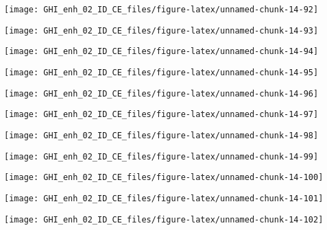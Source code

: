 \documentclass[
  10pt,
  a4paper,oneside]{article}
\begin{document}
\begin{center}\texttt{[image: GHI\_enh\_02\_ID\_CE\_files/figure-latex/unnamed-chunk-14-92]} \end{center}

\begin{center}\texttt{[image: GHI\_enh\_02\_ID\_CE\_files/figure-latex/unnamed-chunk-14-93]} \end{center}

\begin{center}\texttt{[image: GHI\_enh\_02\_ID\_CE\_files/figure-latex/unnamed-chunk-14-94]} \end{center}

\begin{center}\texttt{[image: GHI\_enh\_02\_ID\_CE\_files/figure-latex/unnamed-chunk-14-95]} \end{center}

\begin{center}\texttt{[image: GHI\_enh\_02\_ID\_CE\_files/figure-latex/unnamed-chunk-14-96]} \end{center}

\begin{center}\texttt{[image: GHI\_enh\_02\_ID\_CE\_files/figure-latex/unnamed-chunk-14-97]} \end{center}

\begin{center}\texttt{[image: GHI\_enh\_02\_ID\_CE\_files/figure-latex/unnamed-chunk-14-98]} \end{center}

\begin{center}\texttt{[image: GHI\_enh\_02\_ID\_CE\_files/figure-latex/unnamed-chunk-14-99]} \end{center}

\begin{center}\texttt{[image: GHI\_enh\_02\_ID\_CE\_files/figure-latex/unnamed-chunk-14-100]} \end{center}

\begin{center}\texttt{[image: GHI\_enh\_02\_ID\_CE\_files/figure-latex/unnamed-chunk-14-101]} \end{center}

\begin{center}\texttt{[image: GHI\_enh\_02\_ID\_CE\_files/figure-latex/unnamed-chunk-14-102]} \end{center}
\end{document}
